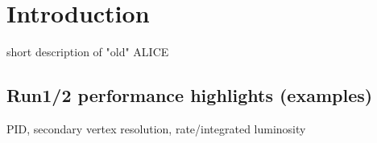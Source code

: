 \section{Introduction}
short description of "old" ALICE~\cite{Aamodt:2008zz}

\subsection{Run1/2 performance highlights (examples)}
PID, secondary vertex resolution, rate/integrated luminosity
